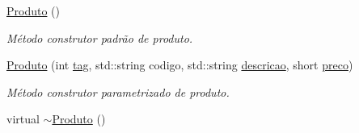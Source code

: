 \begin{DoxyCompactItemize}
\item 
\hypertarget{classProduto_adcd5834a1f04cc42fef88bf60217b8f4}{\hyperlink{classProduto_adcd5834a1f04cc42fef88bf60217b8f4}{Produto} ()}\label{classProduto_adcd5834a1f04cc42fef88bf60217b8f4}

\begin{DoxyCompactList}\small\item\em Método construtor padrão de produto. \end{DoxyCompactList}\item 
\hyperlink{classProduto_ae44d64ad61a5fa8b0f7af193a2f526f4}{Produto} (int \hyperlink{classProduto_a76711f92305c825f07549734cd7c6ade}{tag}, std\-::string codigo, std\-::string \hyperlink{classProduto_ab04a024e24feb7f79774e280356f6bc7}{descricao}, short \hyperlink{classProduto_a2ad13f91582fd70e878fc449c7b77171}{preco})
\begin{DoxyCompactList}\small\item\em Método construtor parametrizado de produto. \end{DoxyCompactList}\item 
\hypertarget{classProduto_a84a8b28176b743e8c74bfd89aee9a9b2}{virtual \hyperlink{classProduto_a84a8b28176b743e8c74bfd89aee9a9b2}{$\sim$\-Produto} ()}\label{classProduto_a84a8b28176b743e8c74bfd89aee9a9b2}


\end{DoxyCompactItemize}
